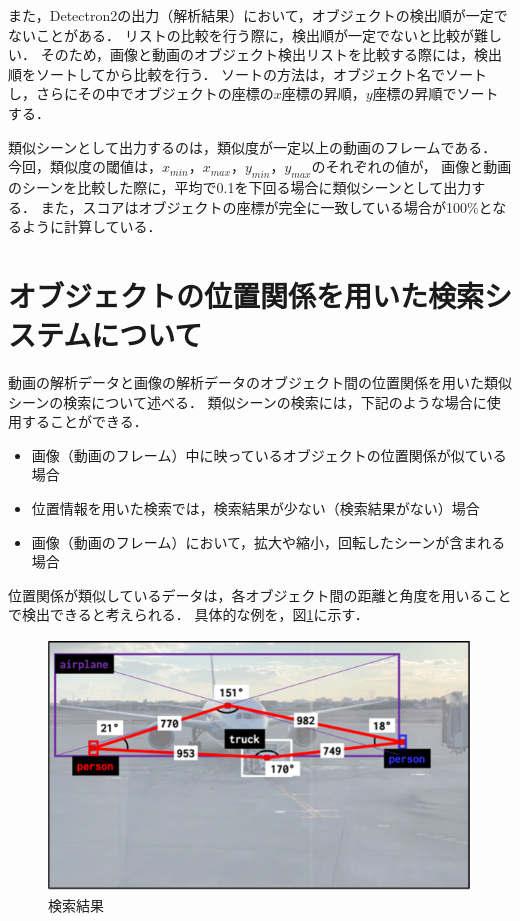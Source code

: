 \documentclass[a4j,12pt,dvipdfmx]{jreport}
\begin{document}
また，Detectron2の出力（解析結果）において，オブジェクトの検出順が一定でないことがある．
リストの比較を行う際に，検出順が一定でないと比較が難しい．
そのため，画像と動画のオブジェクト検出リストを比較する際には，検出順をソートしてから比較を行う．
ソートの方法は，オブジェクト名でソートし，さらにその中でオブジェクトの座標の$x$座標の昇順，$y$座標の昇順でソートする．

類似シーンとして出力するのは，類似度が一定以上の動画のフレームである．
今回，類似度の閾値は，$x_{min}$，$x_{max}$，$y_{min}$，$y_{max}$のそれぞれの値が，
画像と動画のシーンを比較した際に，平均で0.1を下回る場合に類似シーンとして出力する．
また，スコアはオブジェクトの座標が完全に一致している場合が100\%となるように計算している．


\section{オブジェクトの位置関係を用いた検索システムについて}
\label{sec:search_relationship}
動画の解析データと画像の解析データのオブジェクト間の位置関係を用いた類似シーンの検索について述べる．
類似シーンの検索には，下記のような場合に使用することができる．
\begin{itemize}
  \item 画像（動画のフレーム）中に映っているオブジェクトの位置関係が似ている場合
  \item 位置情報を用いた検索では，検索結果が少ない（検索結果がない）場合
  \item 画像（動画のフレーム）において，拡大や縮小，回転したシーンが含まれる場合
\end{itemize}


位置関係が類似しているデータは，各オブジェクト間の距離と角度を用いることで検出できると考えられる．
具体的な例を，図\ref{fig:object_relationship}に示す．

\begin{figure}[b]
  \centering
  \includegraphics[width=13cm]{image/object_relationship.png}
  \caption{検索結果}
  \label{fig:object_relationship}
\end{figure}
\end{document}

